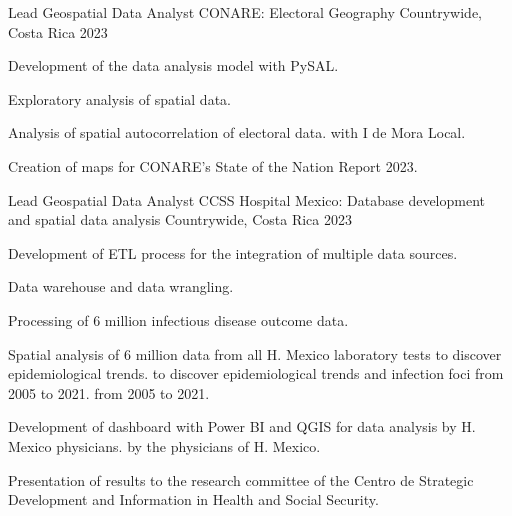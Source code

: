 

\begin{cventries}
\cventry
  {Lead Geospatial Data Analyst} %
  {CONARE: Electoral Geography} %
  {Countrywide, Costa Rica} %
  {2023} %
  {
    \begin{cvitems} %
      \item Development of the data analysis model with PySAL.
      \item Exploratory analysis of spatial data.
      \item Analysis of spatial autocorrelation of electoral data.
      with I de Mora Local.
      \item Creation of maps for CONARE's State of the Nation Report 2023.
    \end{cvitems}
  }
\cventry
  {Lead Geospatial Data Analyst} %
  {CCSS Hospital Mexico: Database development and spatial data analysis} %
  {Countrywide, Costa Rica} %
  {2023} %
  {
    \begin{cvitems} %
      \item Development of ETL process for the integration of multiple data sources.
      \item Data warehouse and data wrangling.
      \item Processing of 6 million infectious disease outcome data.
      \item Spatial analysis of 6 million data from all H. Mexico laboratory tests to
      discover epidemiological trends. to discover epidemiological trends and infection
      foci from 2005 to 2021. from 2005 to 2021.
      \item Development of dashboard with Power BI and QGIS for data analysis by H. Mexico
      physicians. by the physicians of H. Mexico.
      \item Presentation of results to the research committee of the Centro de
      Strategic Development and Information in Health and Social Security.

\end{cvitems}}
\end{cventries}
